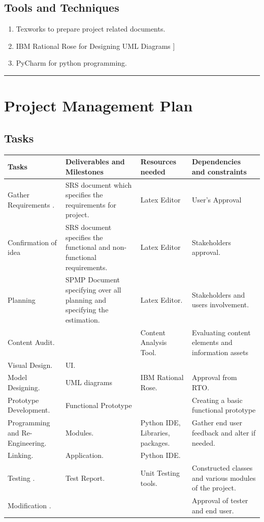 \documentclass[12pt,a4paper,final,oneside]{report}
\begin{document}
\section{ Tools and Techniques}

\begin{enumerate}
\item Texworks to prepare project related documents.
\item IBM Rational Rose for Designing UML Diagrams
]\item PyCharm for python programming.
\end{enumerate}
\rule{16cm}{5pt}
\chapter{Project Management  Plan}
\section{Tasks}\begin{tabular}{ |p{3.5cm}| p{3.5cm} | p{3.5cm} | p{3.5cm}| }
\hline
Tasks& Deliverables and Milestones & Resources needed & Dependencies and constraints \\ 
\hline
Gather Requirements . &SRS document which specifies the requirements for project.& Latex Editor&User’s Approval \\ 
\hline
Confirmation of idea  & SRS document specifies the functional and non-functional requirements. &Latex Editor&Stakeholders approval.\\
 \hline
Planning& SPMP Document specifying over all planning and specifying the estimation.&Latex Editor.&Stakeholders and users involvement.\\ 
\hline
Content Audit.&&Content Analysis Tool.& Evaluating content elements and information assets\\ 
\hline
Visual Design.&UI.&&\\
 \hline
Model Designing.&UML diagrams&IBM Rational Rose.&Approval from RTO.\\ 
\hline
Prototype Development.&Functional Prototype && Creating a basic functional prototype\\ 
\hline
Programming and Re-Engineering.& Modules.& Python IDE, Libraries, packages.& Gather end user feedback and alter if needed. \\ 
\hline
Linking.&Application.&Python IDE.& \\
 \hline
Testing .&Test Report.&Unit Testing tools.&Constructed classes and various modules of the project.\\ 
\hline
Modification .&&&Approval of tester and end user.\\ 
\hline
\end{tabular}
\end{document}
